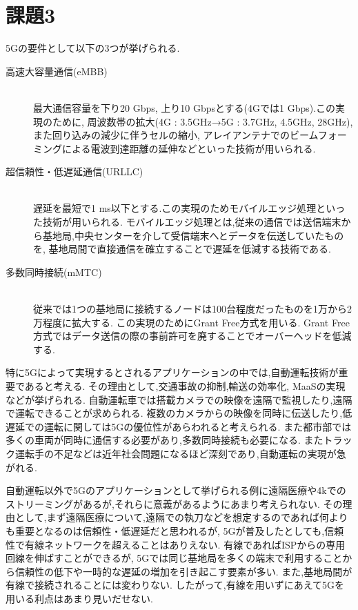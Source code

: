 \section{課題3}
5Gの要件として以下の3つが挙げられる\cite{5G技術の解説と13:online}.
\begin{description}
  \item[高速大容量通信(eMBB)]\mbox{}\\
  最大通信容量を下り20 Gbps, 上り10 Gbpsとする(4Gでは1 Gbps).この実現のために,
  周波数帯の拡大(4G : 3.5GHz→5G : 3.7GHz, 4.5GHz, 28GHz),
  また回り込みの減少に伴うセルの縮小,
  アレイアンテナでのビームフォーミングによる電波到達距離の延伸などといった技術が用いられる.
  \item[超信頼性・低遅延通信(URLLC)]\mbox{}\\
  遅延を最短で1 ms以下とする.この実現のためモバイルエッジ処理といった技術が用いられる.
  モバイルエッジ処理とは,従来の通信では送信端末から基地局,中央センターを介して受信端末へとデータを伝送していたものを,
  基地局間で直接通信を確立することで遅延を低減する技術である.
  \item[多数同時接続(mMTC)]\mbox{}\\
  従来では1つの基地局に接続するノードは100台程度だったものを1万から2万程度に拡大する.
  この実現のためにGrant Free方式を用いる. 
  Grant Free方式ではデータ送信の際の事前許可を廃することでオーバーヘッドを低減する\cite{Microsof84:online}.
\end{description}
特に5Gによって実現するとされるアプリケーションの中では,自動運転技術が重要であると考える.
その理由として,交通事故の抑制,輸送の効率化, MaaSの実現などが挙げられる.
自動運転車では搭載カメラでの映像を遠隔で監視したり,遠隔で運転できることが求められる\cite{2020年には自36:online}.
複数のカメラからの映像を同時に伝送したり,低遅延での運転に関しては5Gの優位性があらわれると考えられる.
また都市部では多くの車両が同時に通信する必要があり,多数同時接続も必要になる.
またトラック運転手の不足などは近年社会問題になるほど深刻であり,自動運転の実現が急がれる.

自動運転以外で5Gのアプリケーションとして挙げられる例に遠隔医療や4kでのストリーミングがあるが,それらに意義があるようにあまり考えられない.
その理由として,まず遠隔医療について,遠隔での執刀などを想定するのであれば何よりも重要となるのは信頼性・低遅延だと思われるが,
5Gが普及したとしても,信頼性で有線ネットワークを超えることはありえない.
有線であればISPからの専用回線を伸ばすことができるが,
5Gでは同じ基地局を多くの端末で利用することから信頼性の低下や一時的な遅延の増加を引き起こす要素が多い.
また,基地局間が有線で接続されることには変わりない.
したがって,有線を用いずにあえて5Gを用いる利点はあまり見いだせない.

